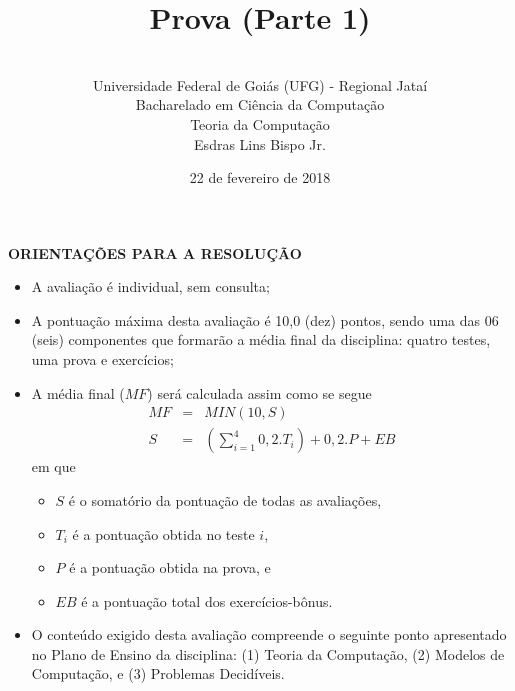 \documentclass[12pt,a4paper,oneside]{article}
\author{\\Universidade Federal de Goiás (UFG) - Regional  Jataí\\Bacharelado em Ciência da Computação \\Teoria da Computação \\Esdras Lins Bispo Jr.}
\date{22 de fevereiro de 2018}
\title{\sc \huge Prova (Parte 1)}
\begin{document}
\maketitle

{\bf ORIENTAÇÕES PARA A RESOLUÇÃO}

\small
 
\begin{itemize}
	\item A avaliação é individual, sem consulta;
	\item A pontuação máxima desta avaliação é 10,0 (dez) pontos, sendo uma das 06 (seis) componentes que formarão a média final da disciplina: quatro testes, uma prova e exercícios;
	\item A média final ($MF$) será calculada assim como se segue
	\begin{eqnarray}
		MF & = & MIN(10, S) \nonumber \\
		S & = & (\sum_{i=1}^{4} 0,2.T_i ) + 0,2.P  + EB\nonumber
	\end{eqnarray}
	em que 
	\begin{itemize}
		\item $S$ é o somatório da pontuação de todas as avaliações,
		\item $T_i$ é a pontuação obtida no teste $i$,
		\item $P$ é a pontuação obtida na prova, e
		\item $EB$ é a pontuação total dos exercícios-bônus.
	\end{itemize}
	\item O conteúdo exigido desta avaliação compreende o seguinte ponto apresentado no Plano de Ensino da disciplina: (1) Teoria da Computação, (2) Modelos de Computação, e (3) Problemas Decidíveis.
\end{itemize}

\begin{center}
\end{center}

\newpage
\end{document}
